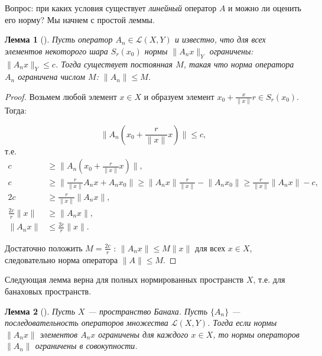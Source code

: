 \documentclass[12pt,a4paper,titlepage,oneside]{book}
\newcommand{\rom}[1]{\uppercase\expandafter{\romannumeral #1\relax}}
\theoremstyle{definition}
\theoremstyle{plain}
\theoremstyle{break}
\theoremstyle{remark}
\theoremstyle{remark}
\theoremstyle{remark}
\theoremstyle{remark}
\theoremstyle{plain}
\newtheorem*{lemma}{Лемма}
\theoremstyle{plain}
\begin{document}
Вопрос: при каких условия существует \textit{линейный} оператор $A$ и можно ли оценить его норму? Мы начнем с простой леммы.

\begin{lemma}[\rom{1}]
Пусть оператор $A_n \in \mathcal{L}(X,Y)$ и известно, что для всех элементов некоторого шара $S_r(x_0)$ нормы $\lVert A_n x\rVert_Y$ ограничены: $\lVert A_n x\rVert_Y \leqslant c$. Тогда существует постоянная $M$, такая что норма оператора $A_n$ ограничена числом $M$: $\lVert A_n \rVert \leqslant M$.
\end{lemma}

\begin{proof}
Возьмем любой элемент $x \in X$ и образуем элемент $x_0+\frac{x}{\lVert x\rVert}r \in S_r(x_0)$. Тогда:

$$\lVert A_n(x_0+\frac{r}{\lVert x \rVert}x) \rVert \leqslant c,$$
т.е.
\begin{align*}
c &\geqslant \lVert A_n(x_0+\frac{r}{\lVert x \rVert}x) \rVert,\\
c &\geqslant \lVert \frac{r}{\lVert x \rVert}A_n x + A_n x_0 \rVert \geqslant \lVert A_n x \rVert \frac{r}{\lVert x\rVert} - \lVert A_n x_0 \rVert \geqslant \frac{r}{\lVert x \rVert}\lVert A_n x \rVert - c,\\
2c &\geqslant \frac{r}{\lVert x \rVert}\lVert A_n x\rVert,\\
\frac{2c}{r}\lVert x \rVert &\geqslant \lVert A_n x\rVert,\\
\lVert A_n x \rVert &\leqslant \frac{2c}{r}\lVert x \rVert.
\end{align*}

Достаточно положить $M=\frac{2c}{r}$ : $\lVert A_n x\rVert \leqslant M\lVert x\rVert$ для всех $x \in X$, следовательно норма оператора $\lVert A\rVert \leqslant M$.
\end{proof}

Следующая лемма верна для полных нормированных пространств $X$, т.е. для банаховых пространств.

\begin{lemma}[\rom{2}]
Пусть $X$ --- пространство Банаха. Пусть $\lbrace A_n\rbrace$ --- последовательность операторов множества $\mathcal{L}(X,Y)$. Тогда если нормы $\lVert A_n x\rVert$ элементов $A_n x$ ограничены для каждого $x \in X$, то нормы операторов $\lVert A_n\rVert$ ограничены в совокупности.
\end{lemma}
\end{document}
